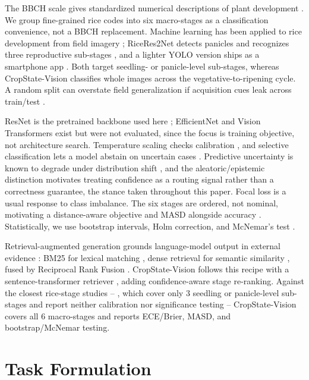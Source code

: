 \documentclass[conference,a4paper]{IEEEtran}
\begin{document}
The BBCH scale gives standardized numerical descriptions of plant development \cite{meier2001bbch}. We group fine-grained rice codes into six macro-stages as a classification convenience, not a BBCH replacement. Machine learning has been applied to rice development from field imagery \cite{tan2022machine}; RiceRes2Net detects panicles and recognizes three reproductive sub-stages \cite{tan2023ricepanicle}, and a lighter YOLO version ships as a smartphone app \cite{zheng2025android}. Both target seedling- or panicle-level sub-stages, whereas CropState-Vision classifies whole images across the vegetative-to-ripening cycle. A random split can overstate field generalization if acquisition cues leak across train/test \cite{kapoor2023leakage}.

ResNet is the pretrained backbone used here \cite{he2016deep}; EfficientNet and Vision Transformers exist but were not evaluated, since the focus is training objective, not architecture search. Temperature scaling checks calibration \cite{guo2017calibration}, and selective classification lets a model abstain on uncertain cases \cite{geifman2017selective}. Predictive uncertainty is known to degrade under distribution shift \cite{ovadia2019trust}, and the aleatoric/epistemic distinction \cite{hullermeier2021aleatoric} motivates treating confidence as a routing signal rather than a correctness guarantee, the stance taken throughout this paper. Focal loss \cite{lin2017focal} is a usual response to class imbalance. The six stages are ordered, not nominal, motivating a distance-aware objective and MASD alongside accuracy \cite{gutierrez2016ordinal}. Statistically, we use bootstrap intervals, Holm correction, and McNemar's test \cite{mcnemar1947note}.

Retrieval-augmented generation grounds language-model output in external evidence \cite{lewis2020rag}: BM25 for lexical matching \cite{robertson2009bm25}, dense retrieval for semantic similarity \cite{karpukhin2020dpr}, fused by Reciprocal Rank Fusion \cite{cormack2009rrf}. CropState-Vision follows this recipe with a sentence-transformer retriever \cite{reimers2019sbert}, adding confidence-aware stage re-ranking. Against the closest rice-stage studies -- \cite{tan2022machine,tan2023ricepanicle,zheng2025android}, which cover only 3 seedling or panicle-level sub-stages and report neither calibration nor significance testing -- CropState-Vision covers all 6 macro-stages and reports ECE/Brier, MASD, and bootstrap/McNemar testing.

\section{Task Formulation}
\end{document}
